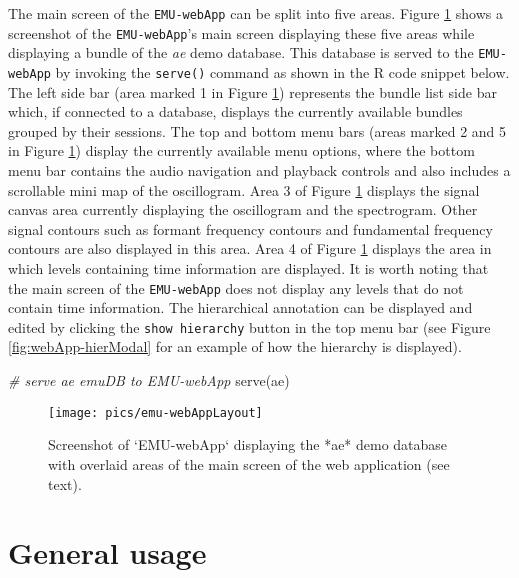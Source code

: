 \documentclass[
]{book}
\newenvironment{Shaded}{\begin{snugshade}}{\end{snugshade}}
\newcommand{\CommentTok}[1]{\textcolor[rgb]{0.56,0.35,0.01}{\textit{#1}}}
\newcommand{\FunctionTok}[1]{\textcolor[rgb]{0.00,0.00,0.00}{#1}}
\newcommand{\NormalTok}[1]{#1}
\begin{document}
The main screen of the \texttt{EMU-webApp} can be split into five areas. Figure \ref{fig:emu-web-emuWebAppLayout} shows a screenshot of the \texttt{EMU-webApp}'s main screen displaying these five areas while displaying a bundle of the \emph{ae} demo database. This database is served to the \texttt{EMU-webApp} by invoking the \texttt{serve()} command as shown in the R code snippet below. The left side bar (area marked 1 in Figure \ref{fig:emu-web-emuWebAppLayout}) represents the bundle list side bar which, if connected to a database, displays the currently available bundles grouped by their sessions. The top and bottom menu bars (areas marked 2 and 5 in Figure \ref{fig:emu-web-emuWebAppLayout}) display the currently available menu options, where the bottom menu bar contains the audio navigation and playback controls and also includes a scrollable mini map of the oscillogram. Area 3 of Figure \ref{fig:emu-web-emuWebAppLayout} displays the signal canvas area currently displaying the oscillogram and the spectrogram. Other signal contours such as formant frequency contours and fundamental frequency contours are also displayed in this area. Area 4 of Figure \ref{fig:emu-web-emuWebAppLayout} displays the area in which levels containing time information are displayed. It is worth noting that the main screen of the \texttt{EMU-webApp} does not display any levels that do not contain time information. The hierarchical annotation can be displayed and edited by clicking the \texttt{show\ hierarchy} button in the top menu bar (see Figure \ref{fig:webApp-hierModal} for an example of how the hierarchy is displayed).

\begin{Shaded}
\begin{Highlighting}[]
\CommentTok{\# serve ae emuDB to EMU{-}webApp}
\FunctionTok{serve}\NormalTok{(ae)}
\end{Highlighting}
\end{Shaded}

\begin{figure}

{\centering \texttt{[image: pics/emu-webAppLayout]} 

}

\caption{Screenshot of `EMU-webApp` displaying the *ae* demo database with overlaid areas of the main screen of the web application (see text).}\label{fig:emu-web-emuWebAppLayout}
\end{figure}

\hypertarget{sec:webApp-generalUsage}{%
\section{General usage}\label{sec:webApp-generalUsage}}
\end{document}
